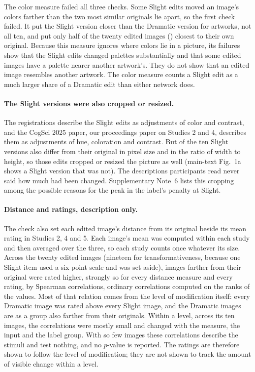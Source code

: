 The color measure failed all three checks. Some Slight edits moved an image's colors farther than the two most similar originals lie apart, so the first check failed. It put the Slight version closer than the Dramatic version for \XSImageCheckTwoColour{} artworks, not all ten, and put only half of the twenty edited images (\XSImageCheckThreeColour) closest to their own original. Because this measure ignores where colors lie in a picture, its failures show that the Slight edits changed palettes substantially and that some edited images have a palette nearer another artwork's. They do not show that an edited image resembles another artwork. The color measure counts a Slight edit as a much larger share of a Dramatic edit than either network does.

\paragraph*{The Slight versions were also cropped or resized.}
The registrations describe the Slight edits as adjustments of color and contrast, and the CogSci 2025 paper, our proceedings paper on Studies 2 and 4, describes them as adjustments of hue, coloration and contrast.\cite{kamper2025originalsin} But \XSImageCheckSlightReframedN{} of the ten Slight versions also differ from their original in pixel size and in the ratio of width to height, so those edits cropped or resized the picture as well (main-text Fig.~1a shows a Slight version that was not). The descriptions participants read never said how much had been changed. Supplementary Note~6 lists this cropping among the possible reasons for the peak in the label's penalty at Slight.

\paragraph*{Distance and ratings, description only.}
The check also set each edited image's distance from its original beside its mean rating in Studies 2, 4 and 5. Each image's mean was computed within each study and then averaged over the three, so each study counts once whatever its size. Across the twenty edited images (nineteen for transformativeness, because one Slight item used a six-point scale and was set aside), images farther from their original were rated higher, strongly so for every distance measure and every rating, by Spearman correlations, ordinary correlations computed on the ranks of the values. Most of that relation comes from the level of modification itself: every Dramatic image was rated above every Slight image, and the Dramatic images are as a group also farther from their originals. Within a level, across its ten images, the correlations were mostly small and changed with the measure, the input and the label group. With so few images these correlations describe the stimuli and test nothing, and no $p$-value is reported. The ratings are therefore shown to follow the level of modification; they are not shown to track the amount of visible change within a level.

